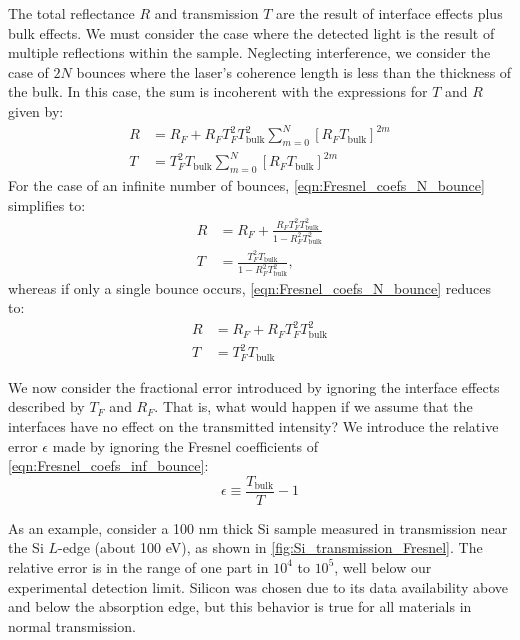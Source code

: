 The total reflectance $R$ and transmission $T$ are the result of interface effects plus bulk effects. We must consider the case where the detected light is the result of multiple reflections within the sample. Neglecting interference, we consider the case of $2N$ bounces where the laser's coherence length is less than the thickness of the bulk. In this case, the sum is incoherent with the expressions for $T$ and $R$ given by:
\begin{equation}
\begin{aligned}
R &= R_F + R_F T_F^2 T_{\text{bulk}}^2 \sum_{m=0}^{N} \left[ R_F T_{\text{bulk}} \right]^{2m} \\
T &= T_F^2 T_{\text{bulk}} \sum_{m=0}^{N} \left[ R_F T_{\text{bulk}} \right]^{2m}
\end{aligned}
\label{eqn:Fresnel_coefs_N_bounce}
\end{equation}
For the case of an infinite number of bounces, \cref{eqn:Fresnel_coefs_N_bounce} simplifies to:
\begin{equation}
\begin{aligned}
R &= R_F + \frac{R_F T_F^2 T_{\text{bulk}}^2}{1-R_F^2 T_{\text{bulk}}^2} \\
T &= \frac{T_F^2 T_{\text{bulk}}}{1-R_F^2 T_{\text{bulk}}^2},
\end{aligned}
\label{eqn:Fresnel_coefs_inf_bounce}
\end{equation}
whereas if only a single bounce occurs, \cref{eqn:Fresnel_coefs_N_bounce} reduces to:
\begin{equation}
\begin{aligned}
R &= R_F + R_F T_F^2 T_{\text{bulk}}^2 \\
T &= T_F^2 T_{\text{bulk}}
\end{aligned}
\label{eqn:Fresnel_coefs_1_bounce}
\end{equation}

We now consider the fractional error introduced by ignoring the interface effects described by $T_F$ and $R_F$. That is, what would happen if we assume that the interfaces have no effect on the transmitted intensity? We introduce the relative error $\epsilon$ made by ignoring the Fresnel coefficients of \cref{eqn:Fresnel_coefs_inf_bounce}:
\begin{equation}
\epsilon \equiv \frac{T_{\text{bulk}}}{T} - 1
\label{eqn:Fresnel_rel_err}
\end{equation}

As an example, consider a 100 nm thick Si sample measured in transmission near the Si $L$-edge (about 100 eV), as shown in \cref{fig:Si_transmission_Fresnel}. The relative error is in the range of one part in $10^4$ to $10^5$, well below our experimental detection limit. Silicon was chosen due to its data availability above and below the absorption edge, but this behavior is true for all materials in normal transmission.

